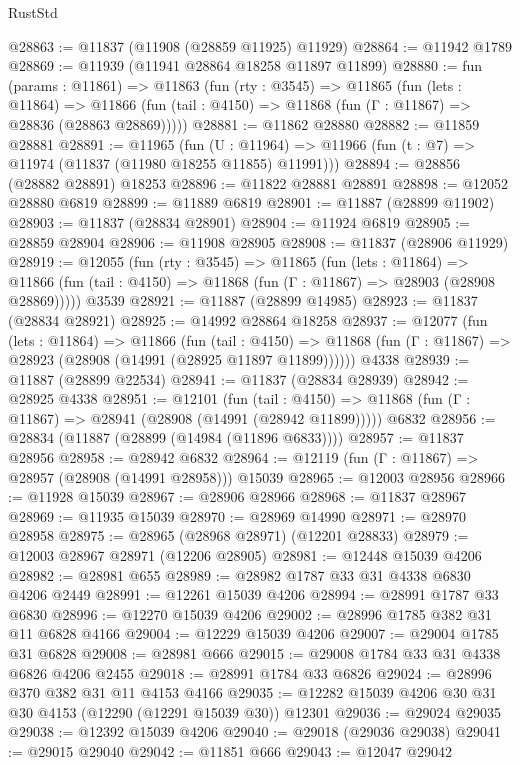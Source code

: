 \begin{lexlean}{RustStd}
\begin{coremodule}
{\begin{coremodule}
{{{{{{{{{{{{{{{{{{{{{{{{{{{{{{{{{{{{{{{{{{{{{{{{{{@28863 := @11837 (@11908 (@28859 @11925) @11929)
@28864 := @11942 @1789
@28869 := @11939 (@11941 @28864 @18258 @11897 @11899)
@28880 := fun (params : @11861) =>
  @11863
    (fun (rty : @3545) =>
    @11865
      (fun (lets : @11864) =>
      @11866 (fun (tail : @4150) => @11868 (fun (Γ : @11867) => @28836 (@28863 @28869)))))
@28881 := @11862 @28880
@28882 := @11859 @28881
@28891 := @11965
    (fun (U : @11964) => @11966 (fun (t : @7) => @11974 (@11837 (@11980 @18255 @11855) @11991)))
@28894 := @28856 (@28882 @28891) @18253
@28896 := @11822 @28881 @28891
@28898 := @12052 @28880 @6819
@28899 := @11889 @6819
@28901 := @11887 (@28899 @11902)
@28903 := @11837 (@28834 @28901)
@28904 := @11924 @6819
@28905 := @28859 @28904
@28906 := @11908 @28905
@28908 := @11837 (@28906 @11929)
@28919 := @12055
    (fun (rty : @3545) =>
    @11865
      (fun (lets : @11864) =>
      @11866 (fun (tail : @4150) => @11868 (fun (Γ : @11867) => @28903 (@28908 @28869)))))
    @3539
@28921 := @11887 (@28899 @14985)
@28923 := @11837 (@28834 @28921)
@28925 := @14992 @28864 @18258
@28937 := @12077
    (fun (lets : @11864) =>
    @11866
      (fun (tail : @4150) =>
      @11868 (fun (Γ : @11867) => @28923 (@28908 (@14991 (@28925 @11897 @11899))))))
    @4338
@28939 := @11887 (@28899 @22534)
@28941 := @11837 (@28834 @28939)
@28942 := @28925 @4338
@28951 := @12101
    (fun (tail : @4150) => @11868 (fun (Γ : @11867) => @28941 (@28908 (@14991 (@28942 @11899)))))
    @6832
@28956 := @28834 (@11887 (@28899 (@14984 (@11896 @6833))))
@28957 := @11837 @28956
@28958 := @28942 @6832
@28964 := @12119 (fun (Γ : @11867) => @28957 (@28908 (@14991 @28958))) @15039
@28965 := @12003 @28956
@28966 := @11928 @15039
@28967 := @28906 @28966
@28968 := @11837 @28967
@28969 := @11935 @15039
@28970 := @28969 @14990
@28971 := @28970 @28958
@28975 := @28965 (@28968 @28971) (@12201 @28833)
@28979 := @12003 @28967 @28971 (@12206 @28905)
@28981 := @12448 @15039 @4206
@28982 := @28981 @655
@28989 := @28982 @1787 @33 @31 @4338 @6830 @4206 @2449
@28991 := @12261 @15039 @4206
@28994 := @28991 @1787 @33 @6830
@28996 := @12270 @15039 @4206
@29002 := @28996 @1785 @382 @31 @11 @6828 @4166
@29004 := @12229 @15039 @4206
@29007 := @29004 @1785 @31 @6828
@29008 := @28981 @666
@29015 := @29008 @1784 @33 @31 @4338 @6826 @4206 @2455
@29018 := @28991 @1784 @33 @6826
@29024 := @28996 @370 @382 @31 @11 @4153 @4166
@29035 := @12282 @15039 @4206 @30 @31 @30 @4153 (@12290 (@12291 @15039 @30)) @12301
@29036 := @29024 @29035
@29038 := @12392 @15039 @4206
@29040 := @29018 (@29036 @29038)
@29041 := @29015 @29040
@29042 := @11851 @666
@29043 := @12047 @29042
}}}}}}}}}}}}}}}}}}}}}}}}}}}}}}}}}}}}}}}}}}}}}}}}}}
\end{coremodule}}
\end{coremodule}
\end{lexlean}
